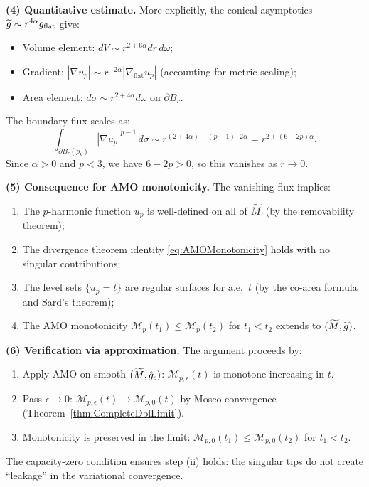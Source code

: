 \begin{remark}
\textbf{(4) Quantitative estimate.} More explicitly, the conical asymptotics $\widetilde{g} \sim r^{4\alpha} g_{\text{flat}}$ give:
\begin{itemize}
    \item Volume element: $dV \sim r^{2+6\alpha} dr \, d\omega$;
    \item Gradient: $|\nabla u_p| \sim r^{-2\alpha} |\nabla_{\text{flat}} u_p|$ (accounting for metric scaling);
    \item Area element: $d\sigma \sim r^{2+4\alpha} d\omega$ on $\partial B_r$.
\end{itemize}
The boundary flux scales as:
\begin{equation}
    \int_{\partial B_r(p_k)} |\nabla u_p|^{p-1} \, d\sigma \sim r^{(2+4\alpha) - (p-1) \cdot 2\alpha} = r^{2 + (6-2p)\alpha}.
\end{equation}
Since $\alpha > 0$ and $p < 3$, we have $6 - 2p > 0$, so this vanishes as $r \to 0$.

\textbf{(5) Consequence for AMO monotonicity.} The vanishing flux implies:
\begin{enumerate}
    \item The $p$-harmonic function $u_p$ is well-defined on all of $\widetilde{M}$ (by the removability theorem);
    \item The divergence theorem identity \eqref{eq:AMOMonotonicity} holds with no singular contributions;
    \item The level sets $\{u_p = t\}$ are regular surfaces for a.e.\ $t$ (by the co-area formula and Sard's theorem);
    \item The AMO monotonicity $\mathcal{M}_p(t_1) \le \mathcal{M}_p(t_2)$ for $t_1 < t_2$ extends to $(\widetilde{M}, \widetilde{g})$.
\end{enumerate}

\textbf{(6) Verification via approximation.} The argument proceeds by:
\begin{enumerate}
    \item[(i)] Apply AMO on smooth $(\widetilde{M}, \hat{g}_\epsilon)$: $\mathcal{M}_{p,\epsilon}(t)$ is monotone increasing in $t$.
    \item[(ii)] Pass $\epsilon \to 0$: $\mathcal{M}_{p,\epsilon}(t) \to \mathcal{M}_{p,0}(t)$ by Mosco convergence (Theorem~\ref{thm:CompleteDblLimit}).
    \item[(iii)] Monotonicity is preserved in the limit: $\mathcal{M}_{p,0}(t_1) \le \mathcal{M}_{p,0}(t_2)$ for $t_1 < t_2$.
\end{enumerate}
The capacity-zero condition ensures step (ii) holds: the singular tips do not create ``leakage'' in the variational convergence.


\end{remark}
